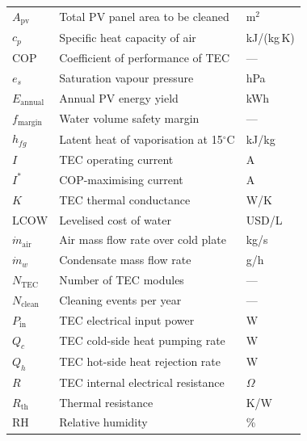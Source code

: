 \documentclass[12pt,a4paper]{report}
\numberwithin{equation}{chapter}
\numberwithin{figure}{chapter}
\numberwithin{table}{chapter}
\newcommand{\degC}{$^\circ$C}
\begin{document}
\begin{tabular}{@{}lll@{}}
$A_\mathrm{pv}$        & Total PV panel area to be cleaned              & m$^2$ \\
$c_p$                  & Specific heat capacity of air                  & kJ/(kg\,K) \\
$\mathrm{COP}$         & Coefficient of performance of TEC              & --- \\
$e_s$                  & Saturation vapour pressure                     & hPa \\
$E_\mathrm{annual}$    & Annual PV energy yield                         & kWh \\
$f_\mathrm{margin}$    & Water volume safety margin                     & --- \\
$h_{fg}$               & Latent heat of vaporisation at 15\degC         & kJ/kg \\
$I$                    & TEC operating current                          & A \\
$I^*$                  & COP-maximising current                         & A \\
$K$                    & TEC thermal conductance                        & W/K \\
$\mathrm{LCOW}$        & Levelised cost of water                        & USD/L \\
$\dot{m}_\mathrm{air}$ & Air mass flow rate over cold plate             & kg/s \\
$\dot{m}_w$            & Condensate mass flow rate                      & g/h \\
$N_\mathrm{TEC}$       & Number of TEC modules                         & --- \\
$N_\mathrm{clean}$     & Cleaning events per year                       & --- \\
$P_\mathrm{in}$        & TEC electrical input power                     & W \\
$Q_c$                  & TEC cold-side heat pumping rate                & W \\
$Q_h$                  & TEC hot-side heat rejection rate               & W \\
$R$                    & TEC internal electrical resistance             & $\Omega$ \\
$R_\mathrm{th}$        & Thermal resistance                             & K/W \\
$\mathrm{RH}$          & Relative humidity                              & \% \\

\end{tabular}
\end{document}
